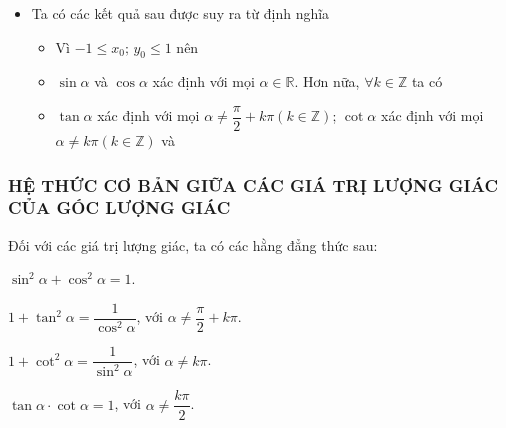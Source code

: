 \begin{itemize}
\begin{gachsoc}
{}
	\end{gachsoc}
	\item []  Ta có các kết quả sau được suy ra từ định nghĩa
	\begin{gachsoc}
		\begin{itemize}
			\item [\ding{172}] Vì $-1 \le x_0;\,y_0 \le 1$ nên
			\item [\ding{173}] $\sin \alpha $ và $\cos \alpha $ xác định với mọi $\alpha \in \mathbb{R}.$ Hơn nữa, $\forall k \in \mathbb{Z}$ ta có
			\item [\ding{174}] $\tan \alpha $ xác định với mọi $\alpha \ne \dfrac{\pi}{2}+k\pi \left(k\in \mathbb{Z}\right)$; $\cot \alpha $ xác định với mọi $\alpha \ne k\pi \left(k\in \mathbb{Z}\right)$ và
		\end{itemize}
	\end{gachsoc}
\end{itemize}
\subsubsection{HỆ THỨC CƠ BẢN GIỮA CÁC GIÁ TRỊ LƯỢNG GIÁC CỦA GÓC LƯỢNG GIÁC}
	Đối với các giá trị lượng giác, ta có các hằng đẳng thức sau:
	\begin{gachsoc}
			\begin{listEX}[2]
			\item [\ding{172}] $\sin^2\alpha+\cos^2\alpha =1$.
			\item [\ding{173}] $1+\tan^2\alpha =\dfrac{1}{\cos^2\alpha}$, với $\alpha \ne \dfrac{\pi}{2}+k\pi$.
			\item [\ding{174}] $1+\cot^2\alpha =\dfrac{1}{\sin^2\alpha}$, với $\alpha \ne k\pi$.
			\item [\ding{175}] $\tan \alpha \cdot \cot \alpha =1$, với $\alpha \ne \dfrac{k\pi}{2}$.
		\end{listEX}
	\end{gachsoc}
